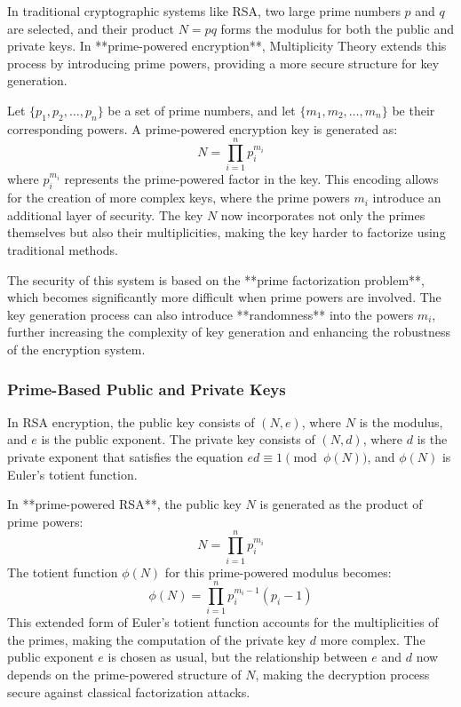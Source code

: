 \documentclass[12pt]{article}
\begin{document}
In traditional cryptographic systems like RSA, two large prime numbers \( p \) and \( q \) are selected, and their product \( N = pq \) forms the modulus for both the public and private keys. In **prime-powered encryption**, Multiplicity Theory extends this process by introducing prime powers, providing a more secure structure for key generation.

Let \( \{p_1, p_2, \dots, p_n\} \) be a set of prime numbers, and let \( \{m_1, m_2, \dots, m_n\} \) be their corresponding powers. A prime-powered encryption key is generated as:
\[
N = \prod_{i=1}^{n} p_i^{m_i}
\]
where \( p_i^{m_i} \) represents the prime-powered factor in the key. This encoding allows for the creation of more complex keys, where the prime powers \( m_i \) introduce an additional layer of security. The key \( N \) now incorporates not only the primes themselves but also their multiplicities, making the key harder to factorize using traditional methods.

The security of this system is based on the **prime factorization problem**, which becomes significantly more difficult when prime powers are involved. The key generation process can also introduce **randomness** into the powers \( m_i \), further increasing the complexity of key generation and enhancing the robustness of the encryption system.

\subsubsection{Prime-Based Public and Private Keys}

In RSA encryption, the public key consists of \( (N, e) \), where \( N \) is the modulus, and \( e \) is the public exponent. The private key consists of \( (N, d) \), where \( d \) is the private exponent that satisfies the equation \( e d \equiv 1 \pmod{\phi(N)} \), and \( \phi(N) \) is Euler's totient function.

In **prime-powered RSA**, the public key \( N \) is generated as the product of prime powers:
\[
N = \prod_{i=1}^{n} p_i^{m_i}
\]
The totient function \( \phi(N) \) for this prime-powered modulus becomes:
\[
\phi(N) = \prod_{i=1}^{n} p_i^{m_i - 1} (p_i - 1)
\]
This extended form of Euler's totient function accounts for the multiplicities of the primes, making the computation of the private key \( d \) more complex. The public exponent \( e \) is chosen as usual, but the relationship between \( e \) and \( d \) now depends on the prime-powered structure of \( N \), making the decryption process secure against classical factorization attacks.
\end{document}
